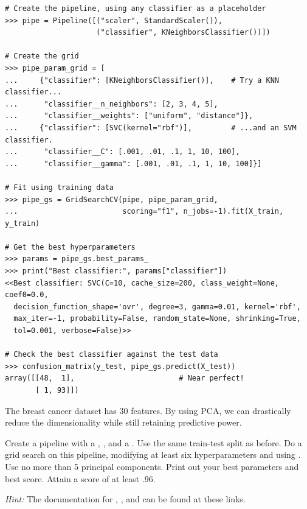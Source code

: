 \begin{lstlisting}
# Create the pipeline, using any classifier as a placeholder
>>> pipe = Pipeline([("scaler", StandardScaler()),
                     ("classifier", KNeighborsClassifier())])

# Create the grid
>>> pipe_param_grid = [
...     {"classifier": [KNeighborsClassifier()],    # Try a KNN classifier...
...      "classifier__n_neighbors": [2, 3, 4, 5],
...      "classifier__weights": ["uniform", "distance"]},
...     {"classifier": [SVC(kernel="rbf")],         # ...and an SVM classifier.
...      "classifier__C": [.001, .01, .1, 1, 10, 100],
...      "classifier__gamma": [.001, .01, .1, 1, 10, 100]}]

# Fit using training data
>>> pipe_gs = GridSearchCV(pipe, pipe_param_grid,
...                        scoring="f1", n_jobs=-1).fit(X_train, y_train)

# Get the best hyperparameters
>>> params = pipe_gs.best_params_
>>> print("Best classifier:", params["classifier"])
<<Best classifier: SVC(C=10, cache_size=200, class_weight=None, coef0=0.0,
  decision_function_shape='ovr', degree=3, gamma=0.01, kernel='rbf',
  max_iter=-1, probability=False, random_state=None, shrinking=True,
  tol=0.001, verbose=False)>>

# Check the best classifier against the test data
>>> confusion_matrix(y_test, pipe_gs.predict(X_test))
array([[48,  1],                        # Near perfect!
       [ 1, 93]])
\end{lstlisting}

\begin{problem} %
The breast cancer dataset has 30 features.
By using PCA, we can drastically reduce the dimensionality while still retaining predictive power.

Create a pipeline with a , , and a .
Use the same train-test split as before.
Do a grid search on this pipeline, modifying at least six hyperparameters and using .
Use no more than 5 principal components.
Print out your best parameters and best score.
Attain a score of at least .96.

\emph{Hint:} The documentation for \href{https://scikit-learn.org/stable/modules/generated/sklearn.preprocessing.StandardScaler.html}{}, \href{https://scikit-learn.org/stable/modules/generated/sklearn.decomposition.PCA.html}{}, and \href{https://scikit-learn.org/stable/modules/generated/sklearn.neighbors.KNeighborsClassifier.html}{} can be found at these links.
\end{problem}





